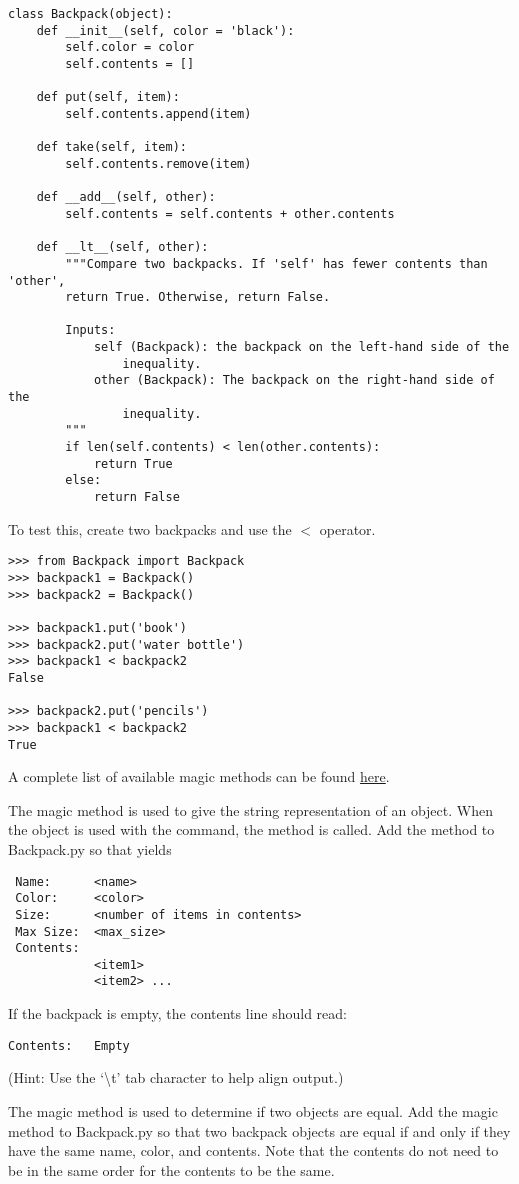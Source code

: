 \begin{lstlisting}
class Backpack(object):
    def __init__(self, color = 'black'):
        self.color = color
        self.contents = []
    
    def put(self, item):
        self.contents.append(item)
    
    def take(self, item):
        self.contents.remove(item)

    def __add__(self, other):
        self.contents = self.contents + other.contents

    def __lt__(self, other):
        """Compare two backpacks. If 'self' has fewer contents than 'other',
        return True. Otherwise, return False.
        
        Inputs:
            self (Backpack): the backpack on the left-hand side of the
                inequality.
            other (Backpack): The backpack on the right-hand side of the
                inequality.
        """
        if len(self.contents) < len(other.contents):
            return True
        else:
            return False
\end{lstlisting}

To test this, create two backpacks and use the $<$ operator.
\begin{lstlisting}
>>> from Backpack import Backpack
>>> backpack1 = Backpack()
>>> backpack2 = Backpack()

>>> backpack1.put('book')
>>> backpack2.put('water bottle')
>>> backpack1 < backpack2
False

>>> backpack2.put('pencils')
>>> backpack1 < backpack2
True
\end{lstlisting}

A complete list of available magic methods can be found \href{https://docs.python.org/2/reference/datamodel.html#special-method-names}{here}.

\begin{problem}
The  magic method is used to give the string representation of an object.
When the object is used with the  command, the  method is called.
Add the  method to Backpack.py so that  yields
\begin{lstlisting}
 Name:		<name>
 Color:		<color>
 Size:		<number of items in contents>
 Max Size:	<max_size>
 Contents:
 			<item1>
 			<item2> ...
\end{lstlisting}

If the backpack is empty, the contents line should read:
\begin{lstlisting}
Contents:	Empty
\end{lstlisting}
(Hint: Use the `\textbackslash{t}' tab character to help align output.)

The  magic method is used to determine if two objects are equal.
Add the  magic method to Backpack.py so that two backpack objects are equal if and only if they have the same name, color, and contents.
Note that the contents do not need to be in the same order for the contents to be the same.
\end{problem}

